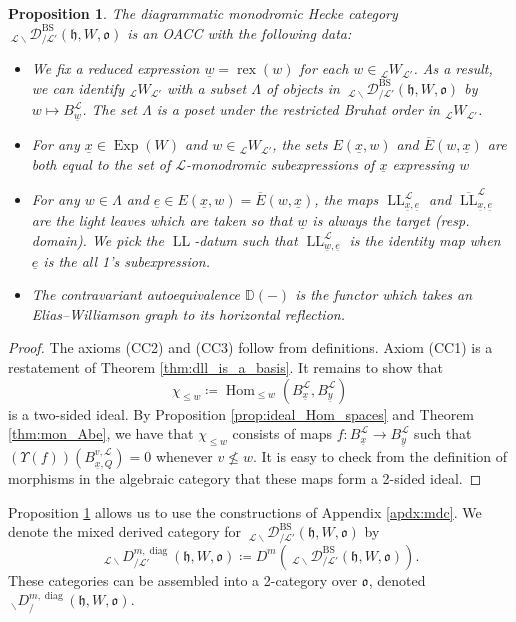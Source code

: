 \documentclass{amsart}
\newcommand{\scrL}{\mathcal{L}}
\DeclareMathOperator{\Hom}{Hom}
\newcommand{\DD}{\mathbb{D}}
\newcommand{\fr}[1]{\mathfrak{#1}}
\DeclareMathOperator{\rex}{rex}
\DeclareMathOperator{\diag}{diag}
\DeclareMathOperator{\BS}{BS}
\DeclareMathOperator{\LL}{LL}
\newcommand{\EWmon}[2]{\:_{#1 \backslash} \mathcal{D}_{/ #2} }
\newcommand{\DDBE}[2]{\:_{#1 \backslash} D_{/ #2}^{m, \diag}}
\DeclareMathOperator{\Exp}{Exp}
\newcommand{\W}[2]{{}_{#1}W_{#2}}
\newcommand{\ue}{\underline{e}}
\newcommand{\uw}{\underline{w}}
\newcommand{\ux}{\underline{x}}
\newcommand{\uy}{\underline{y}}
\newtheorem{proposition}[subsubsection]{Proposition}
\theoremstyle{definition}
\numberwithin{equation}{subsection}
\begin{document}
\begin{proposition}\label{prop:dmhc_is_cellular}
    The diagrammatic monodromic Hecke category $\EWmon{\scrL}{\scrL'}^{\BS} (\fr{h}, W, \fr{o})$ is an OACC with the following data:
    \begin{itemize}
        \item We fix a reduced expression $\uw = \rex (w)$ for each $w \in \W{\scrL}{\scrL'}$. As a result, we can identify $\W{\scrL}{\scrL'}$ with a subset $\Lambda$ of objects in $\EWmon{\scrL}{\scrL'}^{\BS} (\fr{h}, W, \fr{o})$ by $w \mapsto B_{\uw}^{\scrL}$.
                The set $\Lambda$ is a poset under the restricted Bruhat order in $\W{\scrL}{\scrL'}$.
        \item For any $\ux \in \Exp (W)$ and $w \in \W{\scrL}{\scrL'}$, the sets $E(\ux, w)$ and $\overline{E} (w, \ux)$ are both equal to the set of $\scrL$-monodromic subexpressions of $\ux$ expressing $w$
        \item For any $w \in \Lambda$ and $\ue \in E(\ux, w) = \overline{E} (w,\ux)$, the maps $\LL_{\ux, \ue}^{\scrL}$ and $\overline{\LL}_{\ux, \ue}^{\scrL}$ are the light leaves which are taken so that $\uw$ is always the target (resp. domain).
            We pick the $\LL$-datum such that $\LL_{\uw, \ue}^{\scrL}$ is the identity map when $\ue$ is the all 1's subexpression.
        \item The contravariant autoequivalence $\DD (-)$ is the functor which takes an Elias--Williamson graph to its horizontal reflection. 
    \end{itemize} 
\end{proposition}
\begin{proof}
    The axioms (CC2) and (CC3) follow from definitions. Axiom (CC1) is a restatement of Theorem \ref{thm:dll_is_a_basis}. It remains to show that
    \[ \chi_{\leq w} \coloneq \Hom_{\leq w} (B_{\ux}^{\scrL}, B_{\uy}^{\scrL})\]
    is a two-sided ideal.  
    By Proposition \ref{prop:ideal_Hom_spaces} and Theorem \ref{thm:mon_Abe}, we have that $\chi_{\leq w}$ consists of maps $f : B_{\ux}^{\scrL} \to B_{\uy}^{\scrL}$ such that $\left( \Upsilon (f) \right) (B_{\ux, Q}^{v, \scrL}) = 0$ whenever $v \not\leq w$.
    It is easy to check from the definition of morphisms in the algebraic category that these maps form a 2-sided ideal. 
\end{proof}

Proposition \ref{prop:dmhc_is_cellular} allows us to use the constructions of Appendix \ref{apdx:mdc}.
We denote the mixed derived category for $\EWmon{\scrL}{\scrL'}^{\BS} (\fr{h}, W, \fr{o})$ by
\[\DDBE{\scrL}{\scrL'} (\fr{h}, W, \fr{o}) \coloneq D^m \left( \EWmon{\scrL}{\scrL'}^{\BS} (\fr{h}, W, \fr{o})\right).\]
These categories can be assembled into a 2-category over $\fr{o}$, denoted $\DDBE{}{} (\fr{h}, W, \fr{o})$.
\end{document}

